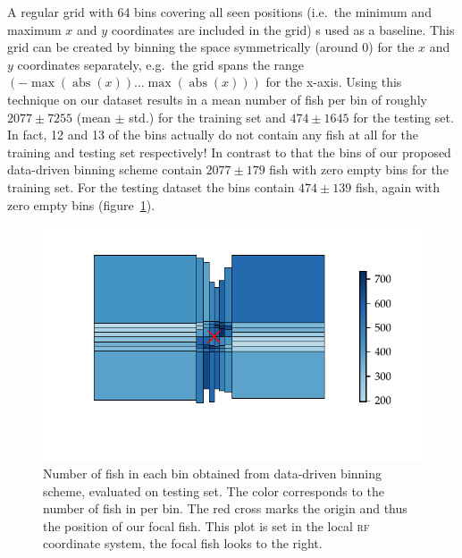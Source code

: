 \documentclass[nobib, a4paper]{tufte-handout}
\begin{document}
A regular grid with 64 bins covering all seen positions (i.e.\ the minimum and maximum $x$ and $y$ coordinates are included in the grid) s used as a baseline.
This grid can be created by binning the space symmetrically (around 0) for the $x$ and $y$ coordinates separately,
e.g.\ the grid spans the range $\left(  -\max(  \operatorname{abs}( x)) \ldots \max ( \operatorname{abs}( x)) \right)$ for the x-axis.
Using this technique on our dataset results in a mean number of fish per bin of roughly \(2077\pm 7255\) (mean $\pm$ std.) for the training set and \(474 \pm 1645\) for the testing set.
In fact, 12 and 13 of the bins actually do not contain any fish at all for the training and testing set respectively!
In contrast to that the bins of our proposed data-driven binning scheme contain $2077 \pm 179$ fish with zero empty bins for the training set.
For the testing dataset the bins contain $474 \pm 139$ fish, again with zero empty bins (figure~\ref{fig:occupancy}).

\begin{figure}[htb]
  \includegraphics{rf_occupancy_test}
   \centering
   \caption{Number of fish in each bin obtained from data-driven binning scheme, evaluated on testing set.
     The color corresponds to the number of fish in per bin.
     The red cross marks the origin and thus the position of our focal fish.
   This plot is set in the local \textsc{rf} coordinate system, the focal fish looks to the right.}
   \label{fig:occupancy}
\end{figure}
\end{document}
